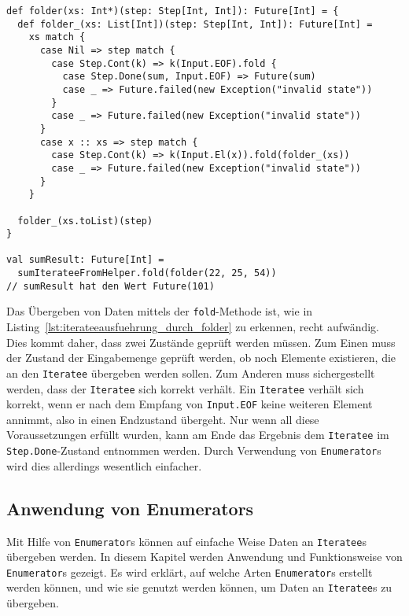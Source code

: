 \begin{lstlisting}[caption=Ausführung eines Iteratees durch folder-Funktion, label=lst:iterateeausfuehrung_durch_folder]
def folder(xs: Int*)(step: Step[Int, Int]): Future[Int] = {
  def folder_(xs: List[Int])(step: Step[Int, Int]): Future[Int] =
    xs match {
      case Nil => step match {
        case Step.Cont(k) => k(Input.EOF).fold {
          case Step.Done(sum, Input.EOF) => Future(sum)
          case _ => Future.failed(new Exception("invalid state"))
        }
        case _ => Future.failed(new Exception("invalid state"))
      }
      case x :: xs => step match {
        case Step.Cont(k) => k(Input.El(x)).fold(folder_(xs))
        case _ => Future.failed(new Exception("invalid state"))
      }
    }

  folder_(xs.toList)(step)
}

val sumResult: Future[Int] =
  sumIterateeFromHelper.fold(folder(22, 25, 54))
// sumResult hat den Wert Future(101)
\end{lstlisting}

Das Übergeben von Daten mittels der \lstinline|fold|-Methode ist, wie in Listing~\ref{lst:iterateeausfuehrung_durch_folder} zu erkennen, recht aufwändig.
Dies kommt daher, dass zwei Zustände geprüft werden müssen.
Zum Einen muss der Zustand der Eingabemenge geprüft werden, ob noch Elemente existieren, die an den \lstinline|Iteratee| übergeben werden sollen.
Zum Anderen muss sichergestellt werden, dass der \lstinline|Iteratee| sich korrekt verhält.
Ein \lstinline|Iteratee| verhält sich korrekt, wenn er nach dem Empfang von \lstinline|Input.EOF| keine weiteren Element annimmt, also in einen Endzustand übergeht.
Nur wenn all diese Voraussetzungen erfüllt wurden, kann am Ende das Ergebnis dem \lstinline|Iteratee| im \lstinline|Step.Done|-Zustand entnommen werden.
Durch Verwendung von \lstinline|Enumerator|s wird dies allerdings wesentlich einfacher.



\subsection{Anwendung von Enumerators} %
\label{sub:enumerators}

Mit Hilfe von \lstinline|Enumerator|s können auf einfache Weise Daten an \lstinline|Iteratee|s übergeben werden.
In diesem Kapitel werden Anwendung und Funktionsweise von \lstinline|Enumerator|s gezeigt.
Es wird erklärt, auf welche Arten \lstinline|Enumerator|s erstellt werden können, und wie sie genutzt werden können, um Daten an \lstinline|Iteratee|s zu übergeben.

